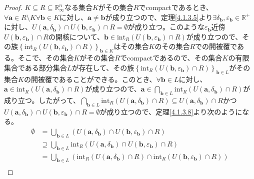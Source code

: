 \documentclass[dvipdfmx]{jsarticle}
\begin{document}
\begin{proof}
$K \subseteq R \subseteq \mathbb{R}_{\infty}^{n}$なる集合$K$がその集合$R$でcompactであるとき、$\forall\mathbf{a} \in R \setminus K\forall\mathbf{b} \in K$に対し、$\mathbf{a} \neq \mathbf{b}$が成り立つので、定理\ref{4.1.3.5}より$\exists\delta_{\mathbf{b}},\varepsilon_{\mathbf{b}} \in \mathbb{R}^{+}$に対し、$U\left( \mathbf{a},\delta_{\mathbf{b}} \right) \cap U\left( \mathbf{b},\varepsilon_{\mathbf{b}} \right) \cap R = \emptyset$が成り立つ。このような$\varepsilon_{\mathbf{b}}$近傍$U\left( \mathbf{b},\varepsilon_{\mathbf{b}} \right) \cap R$の開核について、$\mathbf{b} \in \mathrm{int}_{R}\left( U\left( \mathbf{b},\varepsilon_{\mathbf{b}} \right) \cap R \right)$が成り立つので、その族$\left\{ \mathrm{int}_{R}\left( U\left( \mathbf{b},\varepsilon_{\mathbf{b}} \right) \cap R \right) \right\}_{\mathbf{b} \in K}$はその集合$K$のその集合$R$での開被覆である。そこで、その集合$K$がその集合$R$でcompactであるので、その集合$K$の有限集合である部分集合$L$が存在して、その族$\left\{ \mathrm{int}_{R}\left( U\left( \mathbf{b},\varepsilon_{\mathbf{b}} \right) \cap R \right) \right\}_{\mathbf{b} \in L}$がその集合$K$の開被覆であることができる。このとき、$\forall\mathbf{b} \in L$に対し、$\mathbf{a} \in \mathrm{int}_{R}\left( U\left( \mathbf{a},\delta_{\mathbf{b}} \right) \cap R \right)$が成り立つので、$\mathbf{a} \in \bigcap_{\mathbf{b} \in L} {\mathrm{int}_{R}\left( U\left( \mathbf{a},\delta_{\mathbf{b}} \right) \cap R \right)}$が成り立つ。したがって、$\bigcap_{\mathbf{b} \in L} {\mathrm{int}_{R}\left( U\left( \mathbf{a},\delta_{\mathbf{b}} \right) \cap R \right)} \subseteq U\left( \mathbf{a},\delta_{\mathbf{b}} \right) \cap R$かつ$U\left( \mathbf{a},\delta_{\mathbf{b}} \right) \cap U\left( \mathbf{b},\varepsilon_{\mathbf{b}} \right) \cap R = \emptyset$が成り立つので、定理\ref{4.1.3.8}より次のようになる。
\begin{align*}
\emptyset &= \bigcup_{\mathbf{b} \in L} \left( U\left( \mathbf{a},\delta_{\mathbf{b}} \right) \cap U\left( \mathbf{b},\varepsilon_{\mathbf{b}} \right) \cap R \right)\\
&\supseteq \bigcup_{\mathbf{b} \in L} {\mathrm{int}_{R}\left( U\left( \mathbf{a},\delta_{\mathbf{b}} \right) \cap U\left( \mathbf{b},\varepsilon_{\mathbf{b}} \right) \cap R \right)}\\
&= \bigcup_{\mathbf{b} \in L} \left( \mathrm{int}_{R}\left( U\left( \mathbf{a},\delta_{\mathbf{b}} \right) \cap R \right) \cap \mathrm{int}_{R}\left( U\left( \mathbf{b},\varepsilon_{\mathbf{b}} \right) \cap R \right) \right)\\

\end{align*}
\end{proof}
\end{document}
